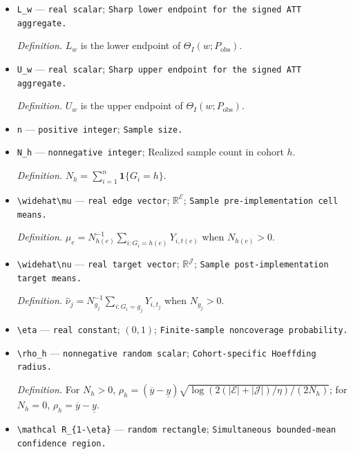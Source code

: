 \documentclass{article}
\begin{document}
\begin{itemize}
  \item \texttt{L\_\allowbreak{}w} --- \texttt{real scalar}; \texttt{Sharp lower endpoint for the signed ATT aggregate.}
  \par\smallskip\noindent\emph{Definition.} \(L_w\) is the lower endpoint of \(\Theta_I(w;P_{\mathrm{obs}})\).
  \item \texttt{U\_\allowbreak{}w} --- \texttt{real scalar}; \texttt{Sharp upper endpoint for the signed ATT aggregate.}
  \par\smallskip\noindent\emph{Definition.} \(U_w\) is the upper endpoint of \(\Theta_I(w;P_{\mathrm{obs}})\).
  \item \texttt{n} --- \texttt{positive integer}; \texttt{Sample size.}
  \item \texttt{N\_\allowbreak{}h} --- \texttt{nonnegative integer}; Realized sample count in cohort \(h\).
  \par\smallskip\noindent\emph{Definition.} \(N_h=\sum_{i=1}^n\mathbf 1\{G_i=h\}\).
  \item \texttt{\textbackslash{}\allowbreak{}widehat\textbackslash{}\allowbreak{}mu} --- \texttt{real edge vector}; \(\mathbb R^{\mathcal E}\); \texttt{Sample pre-\allowbreak{}implementation cell means.}
  \par\smallskip\noindent\emph{Definition.} \(\widehat\mu_e=N_{h(e)}^{-1}\sum_{i:G_i=h(e)}Y_{i,t(e)}\) when \(N_{h(e)}>0\).
  \item \texttt{\textbackslash{}\allowbreak{}widehat\textbackslash{}\allowbreak{}nu} --- \texttt{real target vector}; \(\mathbb R^{\mathcal J}\); \texttt{Sample post-\allowbreak{}implementation target means.}
  \par\smallskip\noindent\emph{Definition.} \(\widehat\nu_j=N_{g_j}^{-1}\sum_{i:G_i=g_j}Y_{i,t_j}\) when \(N_{g_j}>0\).
  \item \texttt{\textbackslash{}\allowbreak{}eta} --- \texttt{real constant}; \((0,1)\); \texttt{Finite-\allowbreak{}sample noncoverage probability.}
  \item \texttt{\textbackslash{}\allowbreak{}rho\_\allowbreak{}h} --- \texttt{nonnegative random scalar}; \texttt{Cohort-\allowbreak{}specific Hoeffding radius.}
  \par\smallskip\noindent\emph{Definition.} For \(N_h>0\), \(\rho_h=(\overline y-\underline y)\sqrt{\log(2(|\mathcal E|+|\mathcal J|)/\eta)/(2N_h)}\); for \(N_h=0\), \(\rho_h=\overline y-\underline y\).
  \item \texttt{\textbackslash{}\allowbreak{}mathcal R\_\allowbreak{}\{1-\allowbreak{}\textbackslash{}\allowbreak{}eta\}\allowbreak{}} --- \texttt{random rectangle}; \texttt{Simultaneous bounded-\allowbreak{}mean confidence region.}

\end{itemize}
\end{document}
